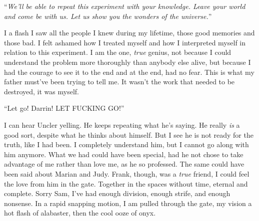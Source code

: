 \documentclass[
]{article}
\begin{document}
``\emph{We'll be able to repeat this experiment with your knowledge.
Leave your world and come be with us. Let us show you the wonders of the
universe.}''

I a flash I saw all the people I knew during my lifetime, those good
memories and those bad. I felt ashamed how I treated myself and how I
interpreted myself in relation to this experiment. I am the one,
\emph{true} genius, not because I could understand the problem more
thoroughly than anybody else alive, but because I had the courage to see
it to the end and at the end, had no fear. This is what my father
must've been trying to tell me. It wasn't the work that needed to be
destroyed, it was myself.

``Let go! Darrin! LET FUCKING GO!''

I can hear Uncler yelling. He keeps repeating what he's saying. He
really \emph{is} a good sort, despite what he thinks about himself. But
I see he is not ready for the truth, like I had been. I completely
understand him, but I cannot go along with him anymore. What we had
could have been special, had he not chose to take advantage of me rather
than love me, as he so professed. The same could have been said about
Marian and Judy. Frank, though, was a \emph{true} friend, I could feel
the love from him in the gate. Together in the spaces without time,
eternal and complete. Sorry Sam, I've had enough division, enough
strife, and enough nonsense. In a rapid snapping motion, I am pulled
through the gate, my vision a hot flash of alabaster, then the cool ooze
of onyx.
\end{document}
